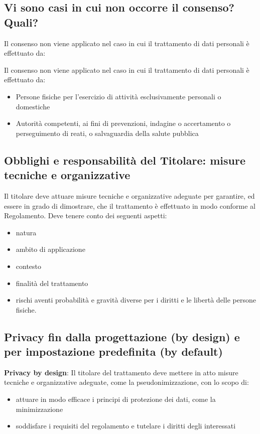 \subsection{Vi sono casi in cui non occorre il consenso? Quali?}
Il consenso non viene applicato nel caso in cui il trattamento di dati personali è effettuato da:

Il consenso non viene applicato nel caso in cui il trattamento di dati personali è effettuato da:
\begin{itemize}
    \item Persone fisiche per l'esercizio di attività esclusivamente personali o domestiche
    \item Autorità competenti, ai fini di prevenzioni, indagine o accertamento o perseguimento di reati, o salvaguardia della salute pubblica
\end{itemize}

\subsection{Obblighi e responsabilità del Titolare: misure tecniche e organizzative}

Il titolare deve attuare misure tecniche e organizzative adeguate per garantire, ed essere in grado di dimostrare, che il trattamento è effettuato in modo conforme al Regolamento.
Deve tenere conto dei seguenti aspetti:
\begin{itemize}
    \item natura
    \item ambito di applicazione
    \item contesto
    \item finalità del trattamento
    \item rischi aventi probabilità e gravità diverse per i diritti e le libertà delle persone fisiche.
\end{itemize}

\subsection{Privacy fin dalla progettazione (by design) e per impostazione predefinita (by default)}

\textbf{Privacy by design}:
\newline
Il titolare del trattamento deve mettere in atto misure tecniche e organizzative adeguate, come la pseudonimizzazione, con lo scopo di:
\begin{itemize}
    \item attuare in modo efficace i principi di protezione dei dati, come la minimizzazione
    \item soddisfare i requisiti del regolamento e tutelare i diritti degli interessati
\end{itemize}

